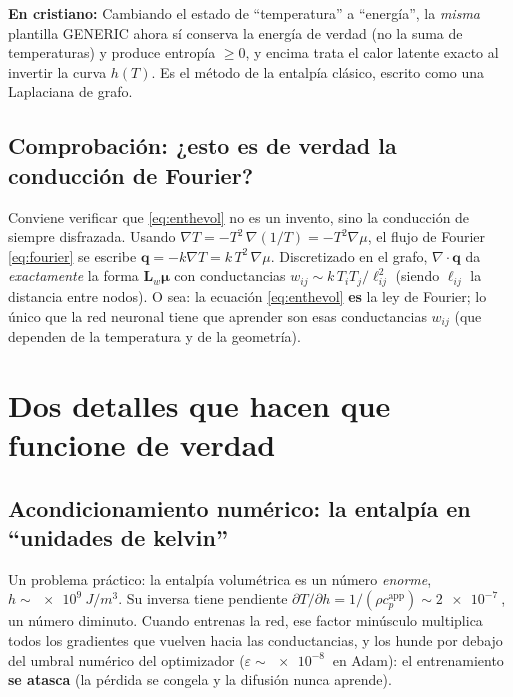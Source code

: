\documentclass[11pt]{article}
\newcommand{\grad}{\nabla}
\newcommand{\cpapp}{c_p^{\mathrm{app}}}
\newcommand{\Lw}{\bm{L}_{w}}
\newcommand{\bmu}{\bm{\mu}}
\theoremstyle{definition}
\theoremstyle{plain}
\newcommand{\dummies}[1]{%
  \par\smallskip\noindent
  \colorbox{yellow!18}{\parbox{\dimexpr\linewidth-2\fboxsep}{%
  \small\textbf{En cristiano:} #1}}\par\smallskip}
\begin{document}
\dummies{Cambiando el estado de ``temperatura'' a ``energía'', la \emph{misma}
plantilla GENERIC ahora sí conserva la energía de verdad (no la suma de
temperaturas) y produce entropía $\ge0$, y encima trata el calor latente exacto al
invertir la curva $h(T)$. Es el método de la entalpía clásico, escrito como una
Laplaciana de grafo.}

\subsection{Comprobación: ¿esto es de verdad la conducción de Fourier?}

Conviene verificar que \eqref{eq:enthevol} no es un invento, sino la conducción de
siempre disfrazada. Usando $\grad T=-T^2\,\grad(1/T)=-T^2\grad\mu$, el flujo de
Fourier \eqref{eq:fourier} se escribe $\bm q=-k\grad T=k\,T^2\,\grad\mu$.
Discretizado en el grafo, $\grad\!\cdot\!\bm q$ da \emph{exactamente} la forma
$\Lw\bmu$ con conductancias $w_{ij}\sim k\,T_iT_j/\ell_{ij}^2$ (siendo $\ell_{ij}$
la distancia entre nodos). O sea: la ecuación \eqref{eq:enthevol} \textbf{es} la
ley de Fourier; lo único que la red neuronal tiene que aprender son esas
conductancias $w_{ij}$ (que dependen de la temperatura y de la geometría).

\section{Dos detalles que hacen que funcione de verdad}
\label{sec:detalles}

\subsection{Acondicionamiento numérico: la entalpía en ``unidades de kelvin''}

Un problema práctico: la entalpía volumétrica es un número \emph{enorme},
$h\sim\SI{e9}{J/m^3}$. Su inversa tiene pendiente $\partial T/\partial h =
1/(\rho\cpapp)\sim\SI{2e-7}{}$, un número diminuto. Cuando entrenas la red, ese
factor minúsculo multiplica todos los gradientes que vuelven hacia las
conductancias, y los hunde por debajo del umbral numérico del optimizador
($\varepsilon\sim\SI{e-8}{}$ en Adam): el entrenamiento \textbf{se atasca} (la
pérdida se congela y la difusión nunca aprende).
\end{document}
